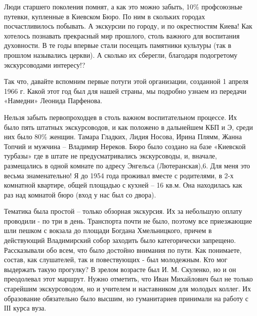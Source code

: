 Люди старшего поколения помнят, а как это можно забыть, 10\% профсоюзные
путевки, купленные в Киевском Бюро. По ним в скольких городах посчастливилось
побывать. А экскурсии по городу, и по окрестностям Киева! Как хотелось
познавать прекрасный мир прошлого, столь важного для воспитания духовности. В
те годы впервые стали посещать памятники культуры (так в прошлом назывались
церкви). А сколько их сберегли, благодаря подогретому экскурсоводами интересу!?

Так что, давайте вспомним первые потуги этой организации, созданной 1 апреля
1966 г. Какой этот год был для нашей страны, мы подробно узнаем из передачи
«Намедни» Леонида Парфенова.

Нельзя забыть первопроходцев в столь важном воспитательном процессе. Их было
пять штатных экскурсоводов, и как положено в дальнейшем КБП и Э, среди них было
80\% женщин. Тамара Гладких, Лидия Носова, Ирина Плямм, Жанна Топчий и мужчина –
Владимир Нереков. Бюро было создано на базе «Киевской турбазы» где в штате не
предусматривались экскурсоводы, и, вначале, размещались в одной комнате по
адресу Энгельса (Лютеранская),6. Для меня это весьма знаменательно! Я до 1954
года проживал вместе с родителями, в 2-х комнатной квартире, общей площадью с
кухней – 16 кв.м. Она находилась как раз над комнатой бюро (вход у нас был со
двора).

Тематика была простой – только обзорная экскурсия. Их за небольшую оплату
проводили - по три в день. Транспорта почти не было, поэтому все приезжающие
шли пешком с вокзала до площади Богдана Хмельницкого, причем в действующий
Владимирский собор заходить было категорически запрещено. Рассказывали обо
всем, что было достойно внимания по пути. Как понимаете, состав, как
слушателей, так и повествующих - был молодежным. Кто мог выдержать такую
прогулку? В зрелом возрасте был И. М. Скуленко, но и он преодолевал этот маршрут.
Нужно отметить, что Иван Михайлович был не только старейшим экскурсоводом, но и
учителем и наставником для молодых коллег. Их образование обязательно было
высшим, но гуманитариев принимали на работу с ІІІ курса вуза.

